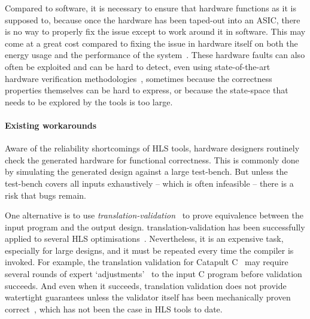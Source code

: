 Compared to software, it is necessary to ensure that hardware functions as it is
supposed to, because once the hardware has been taped-out into an \gls{ASIC},
there is no way to properly fix the issue except to work around it in software.
This may come at a great cost compared to fixing the issue in hardware itself on
both the energy usage and the performance of the
system~\cite{herzog21_price_meltd_spect,bowen20_perfor_cost_softw_based_secur_mitig}.
These hardware faults can also often be exploited and can be hard to detect,
even using state-of-the-art hardware verification
methodologies~\cite{dessouky19_hardf}, sometimes because the correctness
properties themselves can be hard to express, or because the state-space that
needs to be explored by the tools is too large.

\paragraph{Existing workarounds}

Aware of the reliability shortcomings of \gls{HLS} tools, hardware designers
routinely check the generated hardware for functional correctness.  This is
commonly done by simulating the generated design against a large test-bench.
But unless the test-bench covers all inputs exhaustively -- which is often
infeasible -- there is a risk that bugs remain.

One alternative is to use
\emph{\gls{translation-validation}}~\cite{pnueli98_trans} to prove equivalence
between the input program and the output design. \Gls{translation-validation}
has been successfully applied to several \gls{HLS}
optimisations~\cite{kim04_autom_fsmd,
  karfa06_formal_verif_method_sched_high_synth,
  chouksey20_verif_sched_condit_behav_high_level_synth,
  banerjee14_verif_code_motion_techn_using_value_propag,
  chouksey19_trans_valid_code_motion_trans_invol_loops}.  Nevertheless, it is an
expensive task, especially for large designs, and it must be repeated every time
the compiler is invoked.  For example, the translation validation for Catapult
C~\cite{mentor20_catap_high_level_synth} may require several rounds of expert
`adjustments'~\cite[p.~3]{slec_whitepaper} to the input C program before
validation succeeds. And even when it succeeds, translation validation does not
provide watertight guarantees unless the validator itself has been mechanically
proven correct~\cite[e.g.][]{tristan08_formal_verif_trans_valid}, which has not
been the case in \gls{HLS} tools to date.

